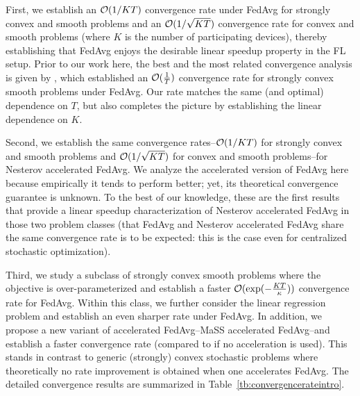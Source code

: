 First, we establish an {\small{${\mathcal{O}}(1/KT)$}} convergence rate  under FedAvg for strongly convex and smooth problems and  an
{\small{${\mathcal{O}}(1/\sqrt{KT})$}} convergence rate for convex
and smooth problems (where $K$ is the number of participating devices), thereby establishing that FedAvg enjoys the desirable linear speedup property in the FL setup. Prior to our work here, the best and the most related convergence analysis is given by \cite{li2019convergence}, which established an ${\mathcal{O}}(\frac{1}{T})$ convergence rate for strongly convex smooth problems under FedAvg. Our rate matches the same (and optimal) dependence on $T$, but also completes the picture by establishing the linear dependence on $K$.

Second, we establish the same convergence rates--{\small{${\mathcal{O}}(1/KT)$}} for strongly convex and smooth problems and {\small{${\mathcal{O}}(1/\sqrt{KT})$}} for convex and smooth problems--for Nesterov accelerated FedAvg. 
We analyze the accelerated version of FedAvg here because empirically it tends to perform better; yet, its theoretical convergence guarantee is unknown. To the best of our knowledge, these are the first results that provide a linear speedup characterization of Nesterov accelerated FedAvg in those two problem classes (that FedAvg and Nesterov accelerated FedAvg share the same convergence rate is to be expected: this is the case even for centralized stochastic optimization). 

Third, we study a subclass of strongly convex smooth problems where the objective is over-parameterized and establish 
a faster ${\mathcal{O}}(\exp(-\frac{KT}{\kappa}))$ convergence rate for FedAvg. Within this class, we further consider the linear regression problem and establish an even sharper rate under FedAvg. In addition, we propose a new variant of accelerated FedAvg--MaSS accelerated FedAvg--and establish a faster convergence rate (compared to if no acceleration is used). This stands in contrast to generic (strongly) convex stochastic problems where theoretically no rate improvement is obtained when one accelerates FedAvg.
The detailed convergence results are summarized in Table~\ref{tb:convergencerateintro}.





